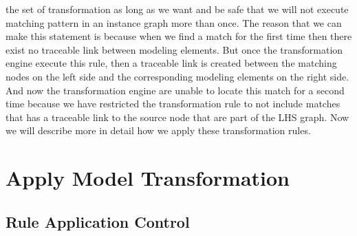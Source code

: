 the set of transformation as long as we want and be safe that we will not
execute matching pattern in an instance graph more than once. The reason that
we can make this statement is because when we find a match for the first time
then there exist no traceable link between modeling elements. But once the
transformation engine execute this rule, then a traceable link is created
between the matching nodes on the left side and the corresponding modeling
elements on the right side. And now the transformation engine are unable to
locate this match for a second time because we have restricted the
transformation rule to not include matches that has a traceable link to the
source node that are part of the LHS graph. Now we will describe more in detail
how we apply these transformation rules.

\section{Apply Model Transformation}

\subsection{Rule Application Control}

